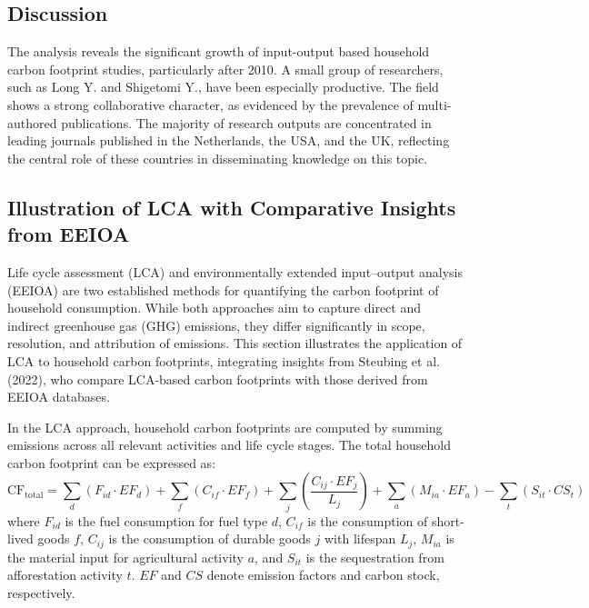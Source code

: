 \documentclass[12pt,a4paper]{article}%
\begin{document}
\subsection{Discussion}

The analysis reveals the significant growth of input-output based household carbon footprint studies, particularly after 2010. A small group of researchers, such as Long Y. and Shigetomi Y., have been especially productive. The field shows a strong collaborative character, as evidenced by the prevalence of multi-authored publications. The majority of research outputs are concentrated in leading journals published in the Netherlands, the USA, and the UK, reflecting the central role of these countries in disseminating knowledge on this topic.

\subsection{Illustration of LCA with Comparative Insights from EEIOA}

Life cycle assessment (LCA) and environmentally extended input--output analysis (EEIOA) are two established methods for quantifying the carbon footprint of household consumption. While both approaches aim to capture direct and indirect greenhouse gas (GHG) emissions, they differ significantly in scope, resolution, and attribution of emissions. This section illustrates the application of LCA to household carbon footprints, integrating insights from Steubing et al. (2022), who compare LCA-based carbon footprints with those derived from EEIOA databases.

In the LCA approach, household carbon footprints are computed by summing emissions across all relevant activities and life cycle stages. The total household carbon footprint can be expressed as:
\begin{equation}
\text{CF}_{\text{total}} = \sum_d (F_{id} \cdot EF_d) 
+ \sum_f (C_{if} \cdot EF_f) 
+ \sum_j \left( \frac{C_{ij} \cdot EF_j}{L_j} \right)
+ \sum_a (M_{ia} \cdot EF_a)
- \sum_t (S_{it} \cdot CS_t)
\end{equation}
where $F_{id}$ is the fuel consumption for fuel type $d$, $C_{if}$ is the consumption of short-lived goods $f$, $C_{ij}$ is the consumption of durable goods $j$ with lifespan $L_j$, $M_{ia}$ is the material input for agricultural activity $a$, and $S_{it}$ is the sequestration from afforestation activity $t$. $EF$ and $CS$ denote emission factors and carbon stock, respectively.
\end{document}
